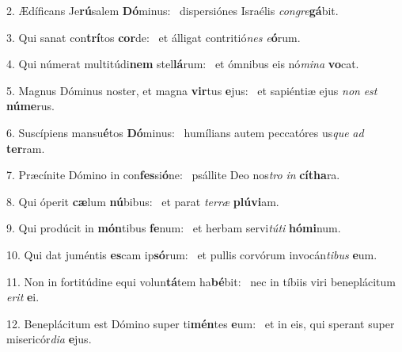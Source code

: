 2. Ædíficans Je\textbf{rú}salem \textbf{Dó}minus: \ast\  dispersiónes Israélis \textit{con}\textit{gre}\textbf{gá}bit.\

3. Qui sanat con\textbf{trí}tos \textbf{cor}de: \ast\  et álligat contritió\textit{nes} \textit{e}\textbf{ó}rum.\

4. Qui númerat multitúdi\textbf{nem} stel\textbf{lá}rum: \ast\  et ómnibus eis nó\textit{mi}\textit{na} \textbf{vo}cat.\

5. Magnus Dóminus noster, et magna \textbf{vir}tus \textbf{e}jus: \ast\  et sapiéntiæ ejus \textit{non} \textit{est} \textbf{nú}\textbf{me}rus.\

6. Suscípiens mansu\textbf{é}tos \textbf{Dó}minus: \ast\  humílians autem peccatóres us\textit{que} \textit{ad} \textbf{ter}ram.\

7. Præcínite Dómino in con\textbf{fes}si\textbf{ó}ne: \ast\  psállite Deo nos\textit{tro} \textit{in} \textbf{cí}\textbf{tha}ra.\

8. Qui óperit \textbf{cæ}lum \textbf{nú}bibus: \ast\  et parat \textit{ter}\textit{ræ} \textbf{plú}\textbf{vi}am.\

9. Qui prodúcit in \textbf{món}tibus \textbf{fe}num: \ast\  et herbam servi\textit{tú}\textit{ti} \textbf{hó}\textbf{mi}num.\

10. Qui dat juméntis \textbf{es}cam ip\textbf{só}rum: \ast\  et pullis corvórum invocán\textit{ti}\textit{bus} \textbf{e}um.\

11. Non in fortitúdine equi volun\textbf{tá}tem ha\textbf{bé}bit: \ast\  nec in tíbiis viri beneplácitum \textit{e}\textit{rit} \textbf{e}i.\

12. Beneplácitum est Dómino super ti\textbf{mén}tes \textbf{e}um: \ast\  et in eis, qui sperant super misericór\textit{di}\textit{a} \textbf{e}jus.\

